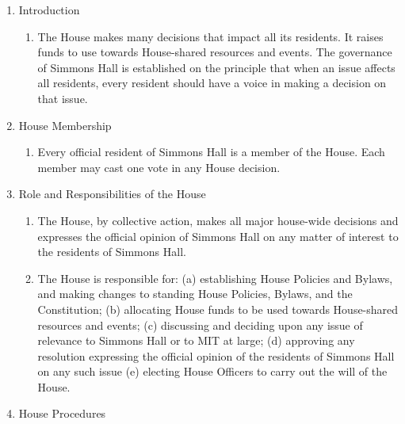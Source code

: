 \documentclass[letterpaper]{article}
\begin{document}
\begin{enumerate}
\begin{enumerate}

\item Introduction 

\begin{enumerate}

\item The House makes many decisions that impact all its residents. It raises funds to use towards House-shared resources and events. The governance of Simmons Hall is established on the principle that when an issue affects all residents, every resident should have a voice in making a decision on that issue. 

\end{enumerate}

\item House Membership 

\begin{enumerate}

\item Every official resident of Simmons Hall is a member of the House. Each member may cast one vote in any House decision.

\end{enumerate}

\item Role and Responsibilities of the House 

\begin{enumerate}

\item The House, by collective action, makes all major house-wide decisions and expresses the official opinion of Simmons Hall on any matter of interest to the residents of Simmons Hall.

\item The House is responsible for: (a) establishing House Policies and Bylaws, and making changes to standing House Policies, Bylaws, and the Constitution; (b) allocating House funds to be used towards House-shared resources and events; (c) discussing and deciding upon any issue of relevance to Simmons Hall or to MIT at large; (d) approving any resolution expressing the official opinion of the residents of Simmons Hall on any such issue (e) electing House Officers to carry out the will of the House.

\end{enumerate}

\item House Procedures 

\begin{enumerate}


\end{enumerate}
\end{enumerate}
\end{enumerate}
\end{document}
